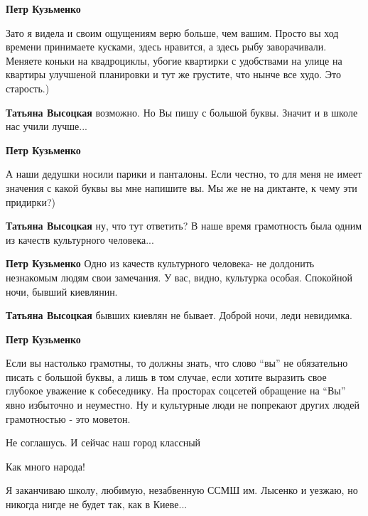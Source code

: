 \begin{itemize}
\begin{itemize}
\begin{itemize} %
\textbf{Петр Кузьменко} 

Зато я видела и своим ощущениям верю больше, чем вашим. Просто вы ход времени
принимаете кусками, здесь нравится, а здесь рыбу заворачивали. Меняете коньки
на квадроциклы, убогие квартирки с удобствами на улице на квартиры улучшеной
планировки и тут же грустите, что нынче все худо. Это старость.)


\textbf{Татьяна Высоцкая} возможно. Но Вы пишу с большой буквы. Значит и в школе нас учили лучше...

\textbf{Петр Кузьменко} 

А наши дедушки носили парики и панталоны. Если честно, то для меня не имеет
значения с какой буквы вы мне напишите вы. Мы же не на диктанте, к чему эти
придирки?)


\textbf{Татьяна Высоцкая} ну, что тут ответить? В наше время грамотность была одним из качеств культурного человека...

\textbf{Петр Кузьменко} Одно из качеств культурного человека- не долдонить незнакомым людям свои замечания. У вас, видно, культурка особая. Спокойной ночи, бывший киевлянин.

\textbf{Татьяна Высоцкая} бывших киевлян не бывает. Доброй ночи, леди невидимка.

\textbf{Петр Кузьменко} 

Если вы настолько грамотны, то должны знать, что слово \enquote{вы} не обязательно
писать с большой буквы, а лишь в том случае, если хотите выразить свое глубокое
уважение к собеседнику. На просторах соцсетей обращение на \enquote{Вы} явно избыточно
и неуместно. Ну и культурные люди не попрекают других людей грамотностью - это
моветон.

\end{itemize} %

Не соглашусь. И сейчас наш город классный

\end{itemize} %

Как много народа!


Я заканчиваю школу, любимую, незабвенную ССМШ им. Лысенко и уезжаю, но никогда
нигде не будет так, как в Киеве...



\end{itemize}
